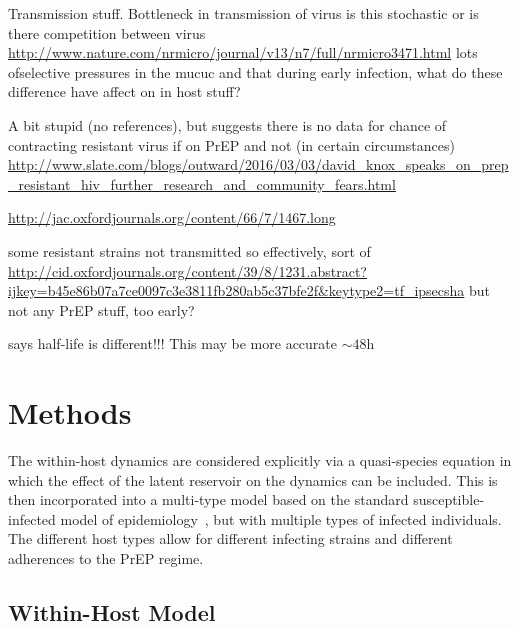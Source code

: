 \documentclass[DIV=15]{scrartcl}
\begin{document}
Transmission stuff. Bottleneck in transmission of virus is this stochastic or is there competition between virus
\url{http://www.nature.com/nrmicro/journal/v13/n7/full/nrmicro3471.html}
lots ofselective pressures in the mucuc and that during early infection, what do these difference have affect on in host stuff?

A bit stupid (no references), but suggests there is no data  for chance of contracting resistant virus if on PrEP and not (in certain circumstances) 
\url{http://www.slate.com/blogs/outward/2016/03/03/david_knox_speaks_on_prep_resistant_hiv_further_research_and_community_fears.html}





\url{http://jac.oxfordjournals.org/content/66/7/1467.long}



some resistant strains not transmitted so effectively, sort of
\url{http://cid.oxfordjournals.org/content/39/8/1231.abstract?ijkey=b45e86b07a7ce0097c3e3811fb280ab5c37bfe2f&keytype2=tf_ipsecsha}
but not any PrEP stuff, too early?





says half-life is different!!! This may be more accurate $\sim 48$h~\cite{patterson2011}

\fi

\section{Methods}
The within-host dynamics are considered explicitly via a   quasi-species equation in which the effect of the latent reservoir on the dynamics can be included.  This is then incorporated into a multi-type model based on the standard susceptible-infected  model of epidemiology~\cite{diekmann2013}, but with multiple types of infected individuals. The different host types allow for different infecting strains and different adherences to the PrEP regime.


\subsection{Within-Host Model}
\end{document}
